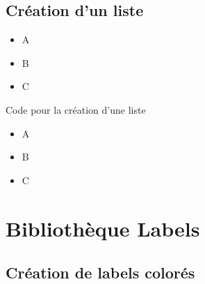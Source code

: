 \documentclass[12pt]{report}
\newcommand{\Triangle}{$\blacktriangleright$}
\newenvironment{items}[2]
{      
        \begin{itemize}[font=\color{#1}, label=#2]  
    }
    { 
        \end{itemize}
}%
\begin{document}

\section{Création d'un liste}

\begin{items}{orange}{\Triangle}
    \item A
    \item B
    \item C
\end{items}

\begin{Latex}{Code pour la création d'une liste}
\begin{items}{orange}{\Triangle}
    \item A
    \item B
    \item C
\end{items}
\end{Latex}\chapter{Bibliothèque Labels}

\section{Création de labels colorés}

 \\
\end{document}
